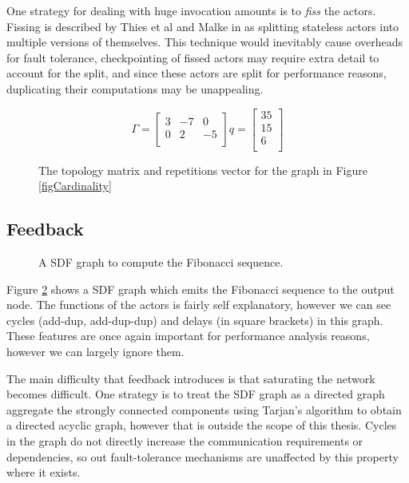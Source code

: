 One strategy for dealing with huge invocation amounts is to {\em fiss} the actors.
Fissing is described by Thies et al and Malke in \cite{thies02, mal08} as splitting stateless actors into multiple versions of themselves.
This technique would inevitably cause overheads for fault tolerance, checkpointing of fissed actors may require extra detail to account for the split, and since these actors are split for performance reasons, duplicating their computations may be unappealing.

\begin{figure}
\begin{center}
\[
 \Gamma = \begin{bmatrix}
	3 & -7 & 0 \\
	0 & 2 & -5 \\
     \end{bmatrix}
	q = \begin{bmatrix}
	35 \\
	15 \\
	6 \\
     \end{bmatrix}
\]
\caption{The topology matrix and repetitions vector for the graph in Figure \ref{figCardinality}}
\label{figCardinalityMaths}
\end{center}
\end{figure}

\subsection{Feedback}

\begin{figure}
\begin{center}
	
\caption{A SDF graph to compute the Fibonacci sequence.}
\label{figFibonacci}
\end{center}
\end{figure}

Figure \ref{figFibonacci} shows a SDF graph which emits the Fibonacci sequence to the output node.
The functions of the actors is fairly self explanatory, however we can see cycles (add-dup, add-dup-dup) and delays (in square brackets) in this graph.
These features are once again important for performance analysis reasons, however we can largely ignore them.

The main difficulty that feedback introduces is that saturating the network becomes difficult.
One strategy is to treat the SDF graph as a directed graph aggregate the strongly connected components using Tarjan's algorithm to obtain a directed acyclic graph, however that is outside the scope of this thesis.
Cycles in the graph do not directly increase the communication requirements or dependencies, so out fault-tolerance mechanisms are unaffected by this property where it exists.